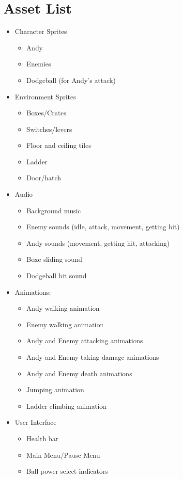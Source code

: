 \documentclass [12pt]{article}
\begin{document}
\section*{Asset List}

\begin{itemize}
\item Character Sprites
	\begin{itemize}
	\item Andy
	\item Enemies
	\item Dodgeball (for Andy's attack)
	\end{itemize}

\item Environment Sprites
	\begin{itemize}
	\item Boxes/Crates
	\item Switches/levers
	\item Floor and ceiling tiles
	\item Ladder
	\item Door/hatch
	\end{itemize}

\item Audio
	\begin{itemize}
	\item Background music
	\item Enemy sounds (idle, attack, movement, getting hit)
	\item Andy sounds (movement, getting hit, attacking)
	\item Boxe sliding sound
	\item Dodgeball hit sound
	\end{itemize}

\item Animations:
	\begin{itemize}
	\item Andy walking animation
	\item Enemy walking animation
	\item Andy and Enemy attacking animations
	\item Andy and Enemy taking damage animations
	\item Andy and Enemy death animations
	\item Jumping animation
	\item Ladder climbing animation
	\end{itemize}

\item User Interface
	\begin{itemize}
	\item Health bar
	\item Main Menu/Pause Menu
	\item Ball power select indicators
	\end{itemize}
\end{itemize}
\end{document}
